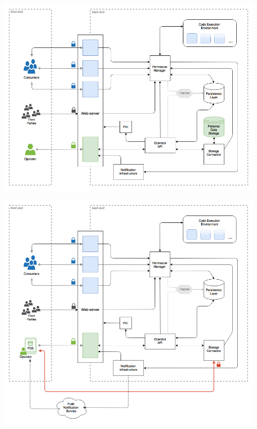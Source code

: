 \documentclass[12pt,english,a4paper,titlepage,cleardoublepage=empty,dottedtoc]{report}
\let\origfigure=\figure
\let\endorigfigure=\endfigure
\renewenvironment{figure}[1][]{%
\origfigure[b]
}{%
\endorigfigure
}
\begin{document}
\begin{figure}
\centering
\includegraphics{./assets/figures/pdaas_component-composition_monolithic.png}
\caption{PDaaS Architecture, monolithic
composition\label{fig:composition-monolithic}}
\end{figure}

\begin{figure}
\centering
\includegraphics{./assets/figures/pdaas_component-composition_distributed.png}
\caption{PDaaS Architecture, distributed
composition\label{fig:composition-distributed}}
\end{figure}
\end{document}
